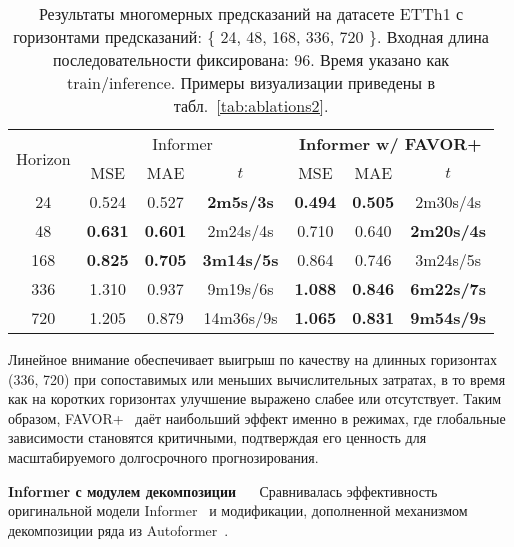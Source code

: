 \begin{table}[!ht]
    \centering
    \begin{tabular}{c| ccc  ccc}
    \toprule
    \multicolumn{1}{c}{\multirow{2}{*}{Horizon}}  
      & \multicolumn{3}{c}{Informer}
      & \multicolumn{3}{c}{\textbf{Informer w/ FAVOR+}} \\
    \cmidrule(lr){2-4} \cmidrule(lr){5-7}
    \multicolumn{1}{c}{} & {MSE} & {MAE} & {$t$} & {MSE} & {MAE} & {$t$} \\
    \midrule
    24   & 0.524 & 0.527 & \textbf{2m5s/3s} & \textbf{0.494} & \textbf{0.505} & 2m30s/4s \\
    48   & \textbf{0.631} & \textbf{0.601} & 2m24s/4s & 0.710 & 0.640 & \textbf{2m20s/4s} \\
    168  & \textbf{0.825} & \textbf{0.705} & \textbf{3m14s/5s} & 0.864 & 0.746 & 3m24s/5s \\
    336  & 1.310 & 0.937 & 9m19s/6s & \textbf{1.088} & \textbf{0.846} & \textbf{6m22s/7s} \\
    720  & 1.205 & 0.879 & 14m36s/9s & \textbf{1.065} & \textbf{0.831} & \textbf{9m54s/9s} \\
    \bottomrule
    \end{tabular}
    \vspace{3pt}
    \caption{Результаты многомерных предсказаний на датасете ETTh1 с 
    горизонтами предсказаний: \{ 24, 48, 168, 336, 720 \}. 
    Входная длина последовательности фиксирована: 96.
    Время указано как train/inference.
    Примеры визуализации приведены в табл.~\ref{tab:ablations2}.}
    \label{tab:etth1-favor}
\end{table}

Линейное внимание обеспечивает выигрыш по качеству на длинных горизонтах (336, 720) 
при сопоставимых или меньших вычислительных затратах, в то время как на коротких горизонтах 
улучшение выражено слабее или отсутствует. Таким образом, FAVOR+~\cite{performer} даёт наибольший эффект именно 
в режимах, где глобальные зависимости становятся критичными, подтверждая его ценность 
для масштабируемого долгосрочного прогнозирования.

\label{sec:ablations3}
\textbf{Informer с модулем декомпозиции} $\quad$ Сравнивалась эффективность 
оригинальной модели Informer~\cite{informer} и модификации, дополненной механизмом 
декомпозиции ряда из Autoformer~\cite{autoformer}.



